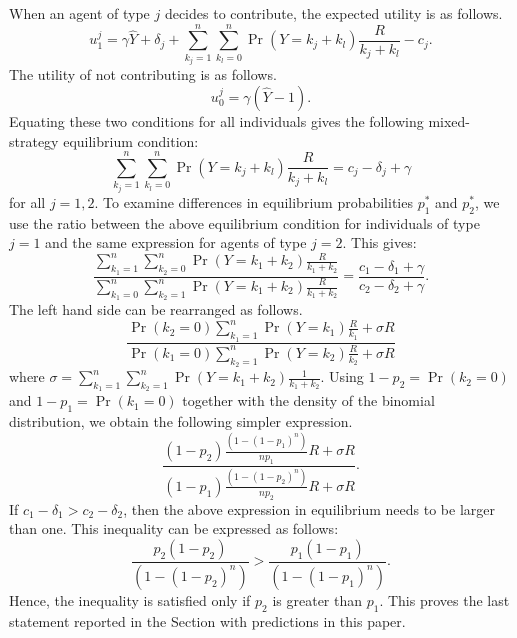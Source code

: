 \documentclass[11pt]{article} %
\begin{document}
When an agent of type $j$ decides to contribute, the expected utility is as follows. 
\begin{equation}
 u_1^j = \gamma \hat Y + \delta_j + \sum_{k_j=1}^n \sum_{k_l=0}^n \Pr(Y=k_j+k_l) \frac{R}{k_j+k_l} - c_j.
\end{equation}
The utility of not contributing is as follows. 
\begin{equation}
 u_0^j = \gamma (\hat Y - 1).
\end{equation}
Equating these two conditions for all individuals gives the following mixed-strategy equilibrium condition:
\begin{equation}
\sum_{k_j=1}^n \sum_{k_l=0}^n \Pr(Y=k_j+k_l) \frac{R}{k_j+k_l} = c_j -\delta_j + \gamma
\end{equation}
for all $j=1,2$. To examine differences in equilibrium probabilities $p_1^*$ and $p_2^*$, we use the ratio between the above equilibrium condition for individuals of type $j=1$ and the same expression for agents of type $j=2$. This gives: 
\begin{equation}
\frac{\sum_{k_1=1}^n \sum_{k_2=0}^n \Pr(Y=k_1+k_2) \frac{R}{k_1+k_2}}{\sum_{k_1=0}^n \sum_{k_2=1}^n \Pr(Y=k_1+k_2) \frac{R}{k_1+k_2}} = \frac{c_1 -\delta_1 + \gamma}{c_2 -\delta_2 + \gamma}.
\end{equation}
The left hand side can be rearranged as follows.
\begin{equation}
\frac{\Pr(k_2=0) \sum_{k_1=1}^n\Pr(Y=k_1)\frac{R}{k_1} +  \sigma R}{\Pr(k_1=0) \sum_{k_2=1}^n\Pr(Y=k_2)\frac{R}{k_2} +  \sigma R} 
\end{equation}
where $\sigma = \sum_{k_1=1}^n \sum_{k_2=1}^n \Pr(Y=k_1+k_2) \frac{1}{k_1+k_2}$.
Using $1-p_2=\Pr(k_2=0)$ and  $1-p_1=\Pr(k_1=0)$ together with the density of the binomial distribution, we obtain the following simpler expression.
\begin{equation}
\frac{(1-p_2) \frac{(1- (1-p_1)^n)}{n p_1} R +  \sigma R }{(1-p_1) \frac{(1- (1-p_2)^n)}{n p_2} R +  \sigma R}  .
\end{equation}
If $c_1 - \delta_1 > c_2 - \delta_2$, then the above expression in equilibrium needs to be larger than one. This inequality can be expressed as follows:
\begin{equation}
\frac{p_2 (1-p_2)}{(1- (1-p_2)^n)}  > \frac{p_1 (1-p_1)}{(1- (1-p_1)^n)}.
\end{equation}
Hence, the inequality is satisfied only if $p_2$ is greater than $p_1$. This proves the last statement reported in the Section with predictions in this paper. 
\end{document}

